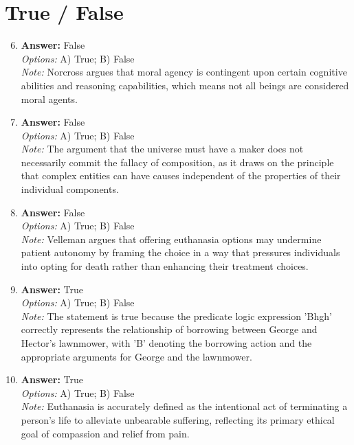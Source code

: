 \documentclass[12pt]{article}
\begin{document}
\section*{True / False}
\begin{enumerate}[label=\arabic*.]
\setcounter{enumi}{5}
\item \textbf{Answer:} False
\\ \textit{Options:} A) True; B) False
\\ \textit{Note:} Norcross argues that moral agency is contingent upon certain cognitive abilities and reasoning capabilities, which means not all beings are considered moral agents.
\item \textbf{Answer:} False
\\ \textit{Options:} A) True; B) False
\\ \textit{Note:} The argument that the universe must have a maker does not necessarily commit the fallacy of composition, as it draws on the principle that complex entities can have causes independent of the properties of their individual components.
\item \textbf{Answer:} False
\\ \textit{Options:} A) True; B) False
\\ \textit{Note:} Velleman argues that offering euthanasia options may undermine patient autonomy by framing the choice in a way that pressures individuals into opting for death rather than enhancing their treatment choices.
\item \textbf{Answer:} True
\\ \textit{Options:} A) True; B) False
\\ \textit{Note:} The statement is true because the predicate logic expression 'Bhgh' correctly represents the relationship of borrowing between George and Hector's lawnmower, with 'B' denoting the borrowing action and the appropriate arguments for George and the lawnmower.
\item \textbf{Answer:} True
\\ \textit{Options:} A) True; B) False
\\ \textit{Note:} Euthanasia is accurately defined as the intentional act of terminating a person's life to alleviate unbearable suffering, reflecting its primary ethical goal of compassion and relief from pain.
\end{enumerate}
\end{document}
